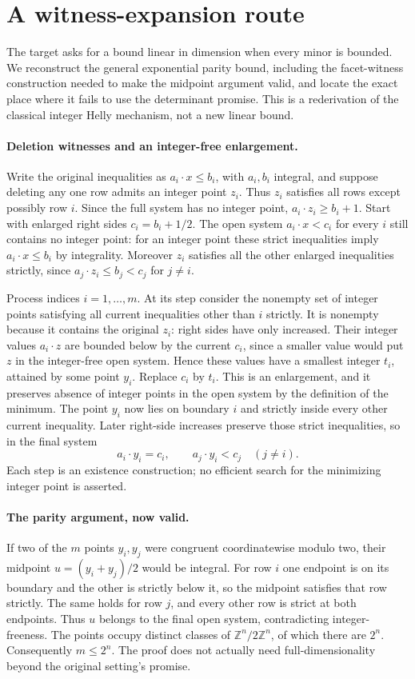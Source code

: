 \documentclass[11pt]{article}
\begin{document}
\section{A witness-expansion route}
The target asks for a bound linear in dimension when every minor
is bounded. We reconstruct the general exponential parity bound,
including the facet-witness construction needed to make the midpoint
argument valid, and locate the exact place where it fails to use
the determinant promise. This is a rederivation of the classical
integer Helly mechanism, not a new linear bound.

\paragraph{Deletion witnesses and an integer-free enlargement.}
Write the original inequalities as $a_i\cdot x\le b_i$,
with $a_i,b_i$ integral, and suppose deleting any one row
admits an integer point $z_i$. Thus $z_i$ satisfies all
rows except possibly row $i$. Since the full system has no
integer point, $a_i\cdot z_i\ge b_i+1$.
Start with enlarged right sides $c_i=b_i+1/2$.
The open system $a_i\cdot x<c_i$ for every $i$ still
contains no integer point: for an integer point these strict
inequalities imply $a_i\cdot x\le b_i$ by integrality.
Moreover $z_i$ satisfies all the other enlarged inequalities
strictly, since $a_j\cdot z_i\le b_j<c_j$ for $j\ne i$.

Process indices $i=1,\ldots,m$. At its step consider the
nonempty set of integer points satisfying all current inequalities
other than $i$ strictly. It is nonempty because it contains
the original $z_i$: right sides have only increased. Their
integer values $a_i\cdot z$ are bounded below by the
current $c_i$, since a smaller value would put $z$ in
the integer-free open system. Hence these values have a smallest
integer $t_i$, attained by some point $y_i$. Replace $c_i$
by $t_i$. This is an enlargement, and it preserves absence of
integer points in the open system by the definition of the minimum.
The point $y_i$ now lies on boundary $i$ and strictly inside
every other current inequality. Later right-side increases preserve
those strict inequalities, so in the final system
\[
a_i\cdot y_i=c_i,
\qquad a_j\cdot y_i<c_j\quad(j\ne i).
\]
Each step is an existence construction; no efficient search for
the minimizing integer point is asserted.

\paragraph{The parity argument, now valid.}
If two of the $m$ points $y_i,y_j$ were congruent coordinatewise
modulo two, their midpoint $u=(y_i+y_j)/2$ would be integral.
For row $i$ one endpoint is on its boundary and the other is
strictly below it, so the midpoint satisfies that row strictly.
The same holds for row $j$, and every other row is strict
at both endpoints. Thus $u$ belongs to the final open system,
contradicting integer-freeness. The points occupy distinct classes
of $\mathbb Z^n/2\mathbb Z^n$, of which there are $2^n$.
Consequently $m\le2^n$. The proof does not actually need
full-dimensionality beyond the original setting's promise.
\end{document}
